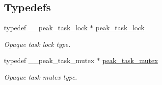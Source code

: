 \subsection*{Typedefs}
\begin{CompactItemize}
\item 
\hypertarget{group__task__sync_ga0}{
typedef \_\-\_\-peak\_\-task\_\-lock $\ast$ \hyperlink{group__task__sync_ga0}{peak\_\-task\_\-lock}}
\label{group__task__sync_ga0}

\begin{CompactList}\small\item\em Opaque task lock type. \item\end{CompactList}\item 
\hypertarget{group__task__sync_ga1}{
typedef \_\-\_\-peak\_\-task\_\-mutex $\ast$ \hyperlink{group__task__sync_ga1}{peak\_\-task\_\-mutex}}
\label{group__task__sync_ga1}

\begin{CompactList}\small\item\em Opaque task mutex type. \item\end{CompactList}\end{CompactItemize}
